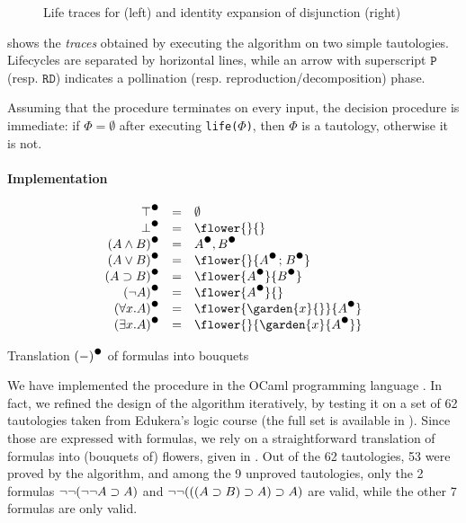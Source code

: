 \begin{figure*}
  
  \caption{Life traces for  (left) and identity expansion of
  disjunction (right)}
\end{figure*}

 shows the \emph{traces} obtained by executing the algorithm
on two simple tautologies. Lifecycles are separated by horizontal lines, while
an arrow with superscript $\mathtt{P}$ (resp. $\mathtt{RD}$) indicates a
pollination (resp. reproduction/decomposition) phase.

Assuming that the  procedure terminates on every input, the
decision procedure is immediate: if $\Phi = \emptyset$ after executing
\texttt{life($\Phi$)}, then $\Phi$ is a tautology, otherwise it is not.

\paragraph{Implementation}

\begin{marginfigure}
  $$
  \begin{array}{r@{\quad=\quad}l}
    \dtrans{\top} & \emptyset \\
    \dtrans{\bot} & \flower{}{} \\
    \dtrans{(A \land B)} & \dtrans{A}, \dtrans{B} \\
    \dtrans{(A \lor B)} & \flower{}{\dtrans{A} \sep \dtrans{B}} \\
    \dtrans{(A \limp B)} & \flower{\dtrans{A}}{\dtrans{B}} \\
    \dtrans{(\neg A)} & \flower{\dtrans{A}}{} \\
    \dtrans{(\forall x. A)} & \flower{\garden{x}{{}}}{\dtrans{A}} \\
    \dtrans{(\exists x. A)} & \flower{}{\garden{x}{\dtrans{A}}}
  \end{array}
  $$
  \caption{Translation $\dtrans{(-)}$ of formulas into bouquets}
\end{marginfigure}

We have implemented the  procedure in the OCaml programming
language \cite{flower-auto}. In fact, we refined the design of the algorithm
iteratively, by testing it on a set of 62 tautologies taken from Edukera's logic
course \cite{edukera} (the full set is available in
). Since those are expressed with  formulas,
we rely on a straightforward translation of formulas into (bouquets of) flowers,
given in . Out of the 62 tautologies, 53 were proved by
the algorithm, and among the 9 unproved tautologies, only the 2 formulas
$\neg\neg(\neg\neg A \supset A)$ and $\neg\neg(((A \supset B) \supset A) \supset A)$ are
 valid, while the other 7 formulas are only  valid.

